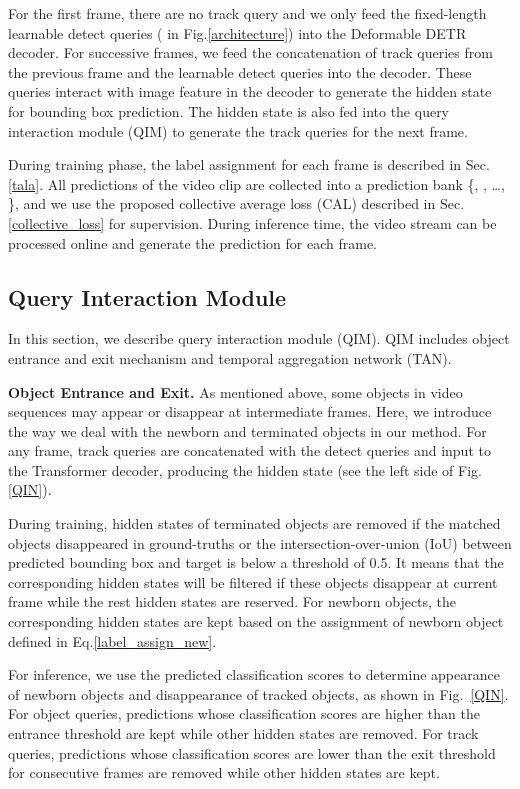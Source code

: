 \documentclass[runningheads]{llncs}
\begin{document}
For the first frame, there are no track query and we only feed the fixed-length learnable detect queries ( in Fig.\;\ref{architecture}) into the Deformable DETR \cite{zhu2020deformdetr} decoder.
For successive frames, we feed the concatenation of track queries from the previous frame and the learnable detect queries into the decoder.
These queries interact with image feature in the decoder to generate the hidden state for bounding box prediction.
The hidden state is also fed into the query interaction module (QIM) to generate the track queries for the next frame.

During training phase, the label assignment for each frame is described in Sec. \ref{tala}.
All predictions of the video clip are collected into a prediction bank \{, , \dots, \}, and we use the proposed collective average loss (CAL) described in Sec.\;\ref{collective_loss} for supervision. During inference time, the video stream can be processed online and generate the prediction for each frame.

\subsection{Query Interaction Module}
\label{QIM}
In this section, we describe query interaction module (QIM). QIM includes object entrance and exit mechanism and temporal aggregation network (TAN).

\noindent \textbf{Object Entrance and Exit.}
As mentioned above, some objects in video sequences may appear or disappear at intermediate frames. Here, we introduce the way we deal with the newborn and terminated objects in our method. For any frame, track queries are concatenated with the detect queries and input to the Transformer decoder, producing the hidden state (see the left side of Fig.\;\ref{QIN}).

During training, hidden states of terminated objects are removed if the matched objects disappeared in ground-truths or the intersection-over-union (IoU) between predicted bounding box and target is below a threshold of 0.5.
It means that the corresponding hidden states will be filtered if these objects disappear at current frame while the rest hidden states are reserved.
For newborn objects, the corresponding hidden states are kept based on the assignment of newborn object  defined in Eq.\;\ref{label_assign_new}.

For inference, we use the predicted classification scores to determine appearance of newborn objects and disappearance of tracked objects, as shown in Fig.~\ref{QIN}.
For object queries, predictions whose classification scores are higher than the entrance threshold  are kept while other hidden states are removed.
For track queries, predictions whose classification scores are lower than the exit threshold  for consecutive  frames are removed while other hidden states are kept.
\end{document}
